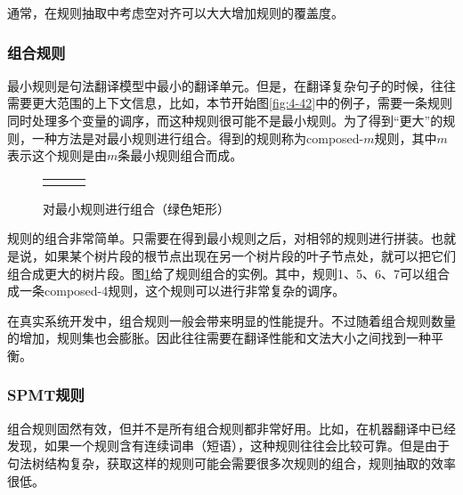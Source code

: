 \parinterval 通常，在规则抽取中考虑空对齐可以大大增加规则的覆盖度。


\subsubsection{组合规则}

\parinterval 最小规则是句法翻译模型中最小的翻译单元。但是，在翻译复杂句子的时候，往往需要更大范围的上下文信息，比如，本节开始图\ref{fig:4-42}中的例子，需要一条规则同时处理多个变量的调序，而这种规则很可能不是最小规则。为了得到``更大''的规则，一种方法是对最小规则进行组合。得到的规则称为composed-$m$规则，其中$m$表示这个规则是由$m$条最小规则组合而成。

\begin{figure}[htp]
\centering
\begin{tabular}{l l l}
& \subfigure{} &  \subfigure{}
\end{tabular}
\caption{对最小规则进行组合（绿色矩形）}
\label{fig:4-56}
\end{figure}

\parinterval 规则的组合非常简单。只需要在得到最小规则之后，对相邻的规则进行拼装。也就是说，如果某个树片段的根节点出现在另一个树片段的叶子节点处，就可以把它们组合成更大的树片段。图\ref{fig:4-56}给了规则组合的实例。其中，规则1、5、6、7可以组合成一条composed-4规则，这个规则可以进行非常复杂的调序。

\parinterval 在真实系统开发中，组合规则一般会带来明显的性能提升。不过随着组合规则数量的增加，规则集也会膨胀。因此往往需要在翻译性能和文法大小之间找到一种平衡。


\subsubsection{SPMT规则}

\parinterval 组合规则固然有效，但并不是所有组合规则都非常好用。比如，在机器翻译中已经发现，如果一个规则含有连续词串（短语），这种规则往往会比较可靠。但是由于句法树结构复杂，获取这样的规则可能会需要很多次规则的组合，规则抽取的效率很低。

